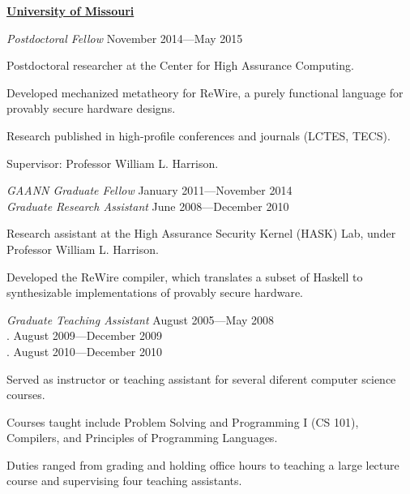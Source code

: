 \documentclass[10pt]{article}
\newenvironment{outerlist}[1][\enskip\textbullet]%
        {\begin{itemize}[#1]}{\end{itemize}%
         \vspace{-.6\baselineskip}}
\newenvironment{innerlist}[1][\enskip\textbullet]%
        {\begin{compactitem}[#1]}{\end{compactitem}}
\newcommand{\blankline}{\quad\pagebreak[2]}
\begin{document}
\blankline

\textbf{\href{http://www.missouri.edu/}{University of Missouri}}
\begin{outerlist}
\item[] \textit{Postdoctoral Fellow} \hfill November 2014---May 2015
        \begin{innerlist}
        \item Postdoctoral researcher at the Center for High Assurance Computing.
        \item Developed mechanized metatheory for ReWire, a purely functional language for provably secure hardware designs.
        \item Research published in high-profile conferences and journals (LCTES, TECS).
        \item Supervisor: Professor William L. Harrison.
        \end{innerlist}
\item[] \textit{GAANN Graduate Fellow} \hfill January 2011---November 2014\\
        \textit{Graduate Research Assistant} \hfill June 2008---December 2010
        \begin{innerlist}
        \item Research assistant at the High Assurance Security Kernel (HASK) Lab, under Professor William L. Harrison.
        \item Developed the ReWire compiler, which translates a subset of Haskell to synthesizable implementations of provably secure hardware.
        \end{innerlist}
\item[] \textit{Graduate Teaching Assistant} \hfill August 2005---May 2008\\
        \color{white}.\color{black}          \hfill August 2009---December 2009\\
        \color{white}.\color{black}          \hfill August 2010---December 2010
        \begin{innerlist}
        \item Served as instructor or teaching assistant for several diferent computer science courses.
        \item Courses taught include Problem Solving and Programming I (CS 101), Compilers, and Principles of Programming Languages.
        \item Duties ranged from grading and holding office hours to teaching a large lecture course and supervising four teaching assistants.
        \end{innerlist}
\end{outerlist}
\end{document}
